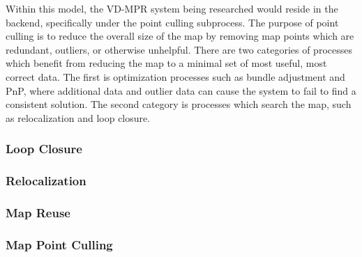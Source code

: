 Within this model, the VD-MPR system being researched would reside in the backend, specifically under the point culling subprocess. The purpose of point culling is to reduce the overall size of the map by removing map points which are redundant, outliers, or otherwise unhelpful. There are two categories of processes which benefit from reducing the map to a minimal set of most useful, most correct data. The first is optimization processes such as bundle adjustment and PnP, where additional data and outlier data can cause the system to fail to find a consistent solution. The second category is processes which search the map, such as relocalization and loop closure.

\subsubsection{Loop Closure}
\subsubsection{Relocalization}
\subsubsection{Map Reuse}
\subsubsection{Map Point Culling}
